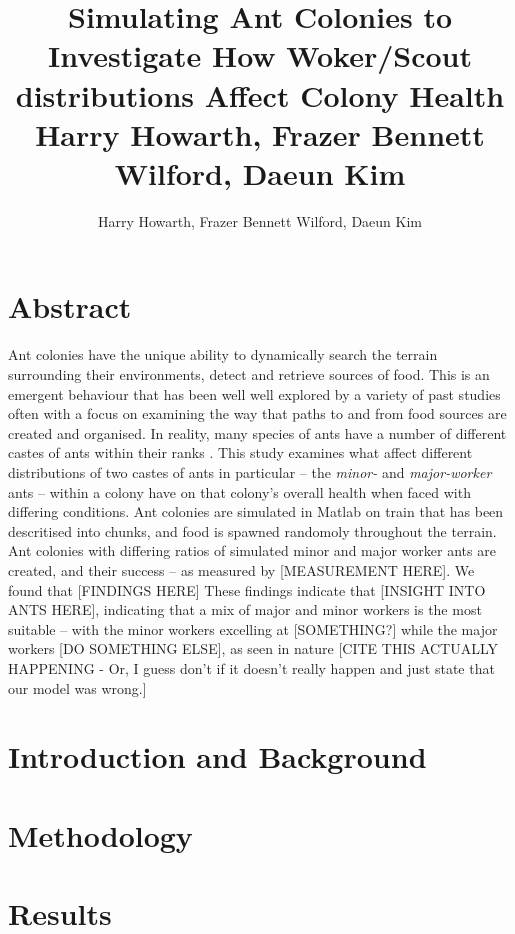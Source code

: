 \documentclass{article}
\title{
  Simulating Ant Colonies to Investigate How Woker/Scout distributions Affect Colony Health
  \small Harry Howarth, Frazer Bennett Wilford, Daeun Kim \\
}
\author{Harry Howarth, Frazer Bennett Wilford, Daeun Kim}
\begin{document}
  
  \section*{Abstract}
    Ant colonies have the unique ability to dynamically search the terrain surrounding their environments, detect and retrieve sources of food. This is an emergent behaviour that
    has been well well explored by a variety of past studies \cite{camazine_self-organization_2003} %
    often with a focus on examining the way that paths to and from food sources are created and organised. %
    In reality, many species of ants have a number of different castes of ants within their ranks \cite{noauthor_caste_nodate}. This study examines what affect different distributions
    of two castes of ants in particular -- the \textit{minor-} and \textit{major-worker} ants -- within a colony have on that colony's overall health when faced with differing conditions.
    Ant colonies are simulated in Matlab on train that has been descritised into chunks, and food is spawned randomoly throughout the terrain. Ant colonies with differing ratios of simulated
    minor and major worker ants are created, and their success -- as measured by [MEASUREMENT HERE].%
    We found that [FINDINGS HERE]
    These findings indicate that [INSIGHT INTO ANTS HERE], indicating that a mix of major and minor workers is the most suitable -- with the minor workers excelling at [SOMETHING?] while the
    major workers [DO SOMETHING ELSE], as seen in nature [CITE THIS ACTUALLY HAPPENING - Or, I guess don't if it doesn't really happen and just state that our model was wrong.]

  \section{Introduction and Background}
  \section{Methodology}
  \section{Results}
\end{document}
